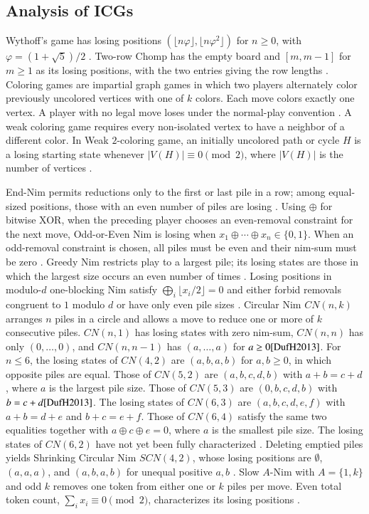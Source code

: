 \documentclass[review]{elsarticle}
\begin{document}
\subsection{Analysis of ICGs}
{\color{red}
Wythoff's game has losing positions $(\lfloor n\varphi\rfloor,\lfloor n\varphi^{2}\rfloor)$ for $n\geq 0$, with $\varphi=(1+\sqrt{5})/2$ \cite{Wyt1907}.
Two-row Chomp has the empty board and $[m,m-1]$ for $m\geq 1$ as its losing positions, with the two entries giving the row lengths \cite{BroHMS2005}.
Coloring games are impartial graph games in which two players alternately color previously uncolored vertices with one of $k$ colors.
Each move colors exactly one vertex.
A player with no legal move loses under the normal-play convention \cite{BeaBD2013}.
A weak coloring game requires every non-isolated vertex to have a neighbor of a different color.
In Weak $2$-coloring game, an initially uncolored path or cycle $H$ is a losing starting state whenever $|V(H)|\equiv 0\pmod{2}$, where $|V(H)|$ is the number of vertices \cite{BeaBD2013}.

End-Nim permits reductions only to the first or last pile in a row; among equal-sized positions, those with an even number of piles are losing \cite{AlbN2001}.
Using $\oplus$ for bitwise XOR, when the preceding player chooses an even-removal constraint for the next move, Odd-or-Even Nim is losing when $x_1\oplus\cdots\oplus x_n\in\{0,1\}$.
When an odd-removal constraint is chosen, all piles must be even and their nim-sum must be zero \cite{SmiS2002}.
Greedy Nim restricts play to a largest pile; its losing states are those in which the largest size occurs an even number of times \cite{AlbN2004}.
Losing positions in modulo-$d$ one-blocking Nim satisfy $\bigoplus_i\lfloor x_i/2\rfloor=0$ and either forbid removals congruent to $1$ modulo $d$ or have only even pile sizes \cite{GavS2004}.
Circular Nim $CN(n,k)$ arranges $n$ piles in a circle and allows a move to reduce one or more of $k$ consecutive piles.
$CN(n,1)$ has losing states with zero nim-sum, $CN(n,n)$ has only $(0,\ldots,0)$, and $CN(n,n-1)$ has $(a,\ldots,a)$ for $a\geq 0 \cite{DufH2013}$.
For $n\leq 6$, the losing states of $CN(4,2)$ are $(a,b,a,b)$ for $a,b\geq 0$, in which opposite piles are equal.
Those of $CN(5,2)$ are $(a,b,c,d,b)$ with $a+b=c+d$, where $a$ is the largest pile size.
Those of $CN(5,3)$ are $(0,b,c,d,b)$ with $b=c+d \cite{DufH2013}$.
The losing states of $CN(6,3)$ are $(a,b,c,d,e,f)$ with $a+b=d+e$ and $b+c=e+f$.
Those of $CN(6,4)$ satisfy the same two equalities together with $a\oplus c\oplus e=0$, where $a$ is the smallest pile size.
The losing states of $CN(6,2)$ have not yet been fully characterized \cite{DufH2013}.
Deleting emptied piles yields Shrinking Circular Nim $SCN(4,2)$, whose losing positions are $\emptyset$, $(a,a,a)$, and $(a,b,a,b)$ for unequal positive $a,b$ \cite{OgiS2025}.
Slow $A$-Nim with $A=\{1,k\}$ and odd $k$ removes one token from either one or $k$ piles per move.
Even total token count, $\sum_i x_i\equiv 0\pmod{2}$, characterizes its losing positions \cite{DufH2026}.
}
\end{document}
